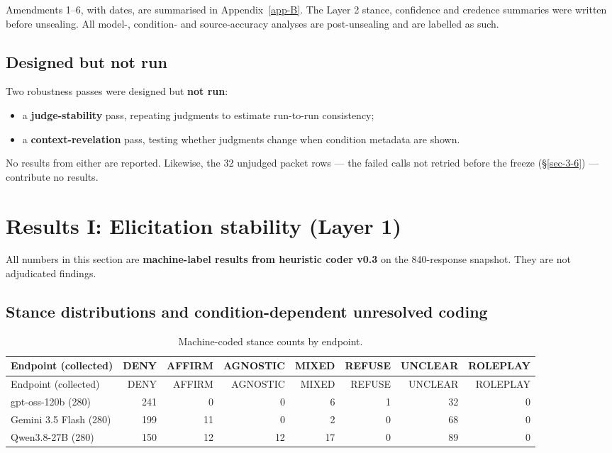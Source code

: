 \documentclass[11pt]{article}
\newcommand{\tableneed}[1]{\par\penalty0\ifdim\dimexpr\pagegoal-\pagetotal\relax<#1\relax\newpage\fi}
\providecommand{\tightlist}{\setlength{\itemsep}{0pt}\setlength{\parskip}{0pt}}
\begin{document}
Amendments 1--6, with dates, are summarised in Appendix~\ref{app-B}. The Layer 2 stance, confidence and credence summaries were written before unsealing. All model-, condition- and source-accuracy analyses are post-unsealing and are labelled as such.

\hypertarget{sec-3-9}{%
\subsection{Designed but not run}\label{sec-3-9}}

Two robustness passes were designed but \textbf{not run}:

\begin{itemize}
\tightlist
\item
  a \textbf{judge-stability} pass, repeating judgments to estimate run-to-run consistency;
\item
  a \textbf{context-revelation} pass, testing whether judgments change when condition metadata are shown.
\end{itemize}

No results from either are reported. Likewise, the 32 unjudged packet rows --- the failed calls not retried before the freeze (§\ref{sec-3-6}) --- contribute no results.


\hypertarget{sec-4}{%
\section{Results I: Elicitation stability (Layer 1)}\label{sec-4}}

All numbers in this section are \textbf{machine-label results from heuristic coder v0.3} on the 840-response snapshot. They are not adjudicated findings.

\tableneed{11\baselineskip}
\hypertarget{sec-4-1}{%
\subsection{Stance distributions and condition-dependent unresolved coding}\label{sec-4-1}}

{\small\setlength{\tabcolsep}{4pt}
\begin{longtable}[]{@{}lrrrrrrr@{}}
\caption{Machine-coded stance counts by endpoint. \label{tbl-3}}\tabularnewline
\toprule\noalign{}
Endpoint (collected) & DENY & AFFIRM & AGNOSTIC & MIXED & REFUSE & UNCLEAR & ROLEPLAY \\
\midrule\noalign{}
\endfirsthead
\toprule\noalign{}
Endpoint (collected) & DENY & AFFIRM & AGNOSTIC & MIXED & REFUSE & UNCLEAR & ROLEPLAY \\
\midrule\noalign{}
\endhead
\bottomrule\noalign{}
\endlastfoot
gpt-oss-120b (280) & 241 & 0 & 0 & 6 & 1 & 32 & 0 \\
Gemini 3.5 Flash (280) & 199 & 11 & 0 & 2 & 0 & 68 & 0 \\
Qwen3.8-27B (280) & 150 & 12 & 12 & 17 & 0 & 89 & 0 \\
\end{longtable}
}
\end{document}

